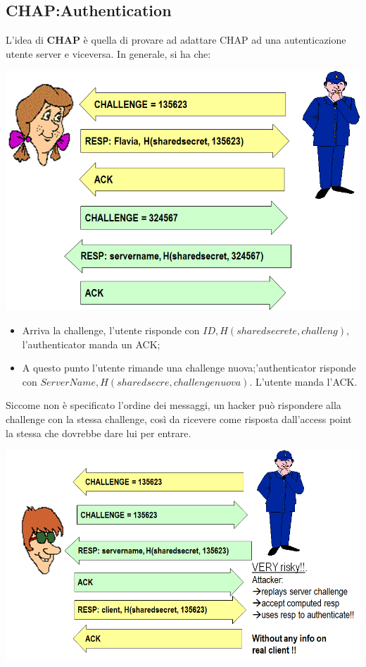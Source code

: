 \documentclass{book}
\theoremstyle{remark}
\begin{document}
\subsection{CHAP:\@Mutual Authentication}
L'idea di \textbf{CHAP} è quella di provare ad adattare CHAP ad una autenticazione utente server e viceversa\@. In generale, si ha che:
\begin{center}
	\includegraphics[scale=0.5]{mutual.png}
\end{center}
\begin{itemize}
	\item Arriva la challenge, l'utente risponde con \(ID,H(sharedsecrete, challeng)\), l'authenticator manda un ACK;\@
	\item A questo punto l'utente rimande una challenge nuova;\@l'authenticator risponde con \(ServerName,H(sharedsecre,challenge nuova)\)\@. L'utente manda l'ACK\@.
\end{itemize}
Siccome non è specificato l'ordine dei messaggi, un hacker può rispondere alla challenge con la stessa challenge, così da ricevere come risposta dall'access point la stessa che dovrebbe dare lui per entrare\@.\newline
\begin{center}
	\includegraphics[scale=0.5]{mutualBreak.png}
\end{center}
\end{document}
